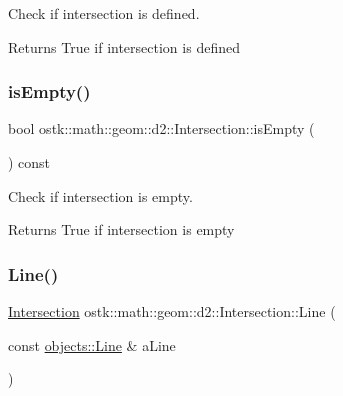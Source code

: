 Check if intersection is defined. 

\begin{DoxyReturn}{Returns}
True if intersection is defined 
\end{DoxyReturn}
\mbox{\label{classostk_1_1math_1_1geom_1_1d2_1_1_intersection_ab6699c3c64a7cb809e210a1cf948f80c}} 
\subsubsection{\texorpdfstring{is\+Empty()}{isEmpty()}}
{\footnotesize\ttfamily bool ostk\+::math\+::geom\+::d2\+::\+Intersection\+::is\+Empty (\begin{DoxyParamCaption}{ }\end{DoxyParamCaption}) const}



Check if intersection is empty. 

\begin{DoxyReturn}{Returns}
True if intersection is empty 
\end{DoxyReturn}
\mbox{\label{classostk_1_1math_1_1geom_1_1d2_1_1_intersection_a536bc73bc0e02fecc86c6f31d7bf77e0}} 
\subsubsection{\texorpdfstring{Line()}{Line()}}
{\footnotesize\ttfamily \hyperlink{classostk_1_1math_1_1geom_1_1d2_1_1_intersection}{Intersection} ostk\+::math\+::geom\+::d2\+::\+Intersection\+::\+Line (\begin{DoxyParamCaption}\item[{const \hyperlink{classostk_1_1math_1_1geom_1_1d2_1_1objects_1_1_line}{objects\+::\+Line} \&}]{a\+Line }\end{DoxyParamCaption})\hspace{0.3cm}{\ttfamily [static]}}



